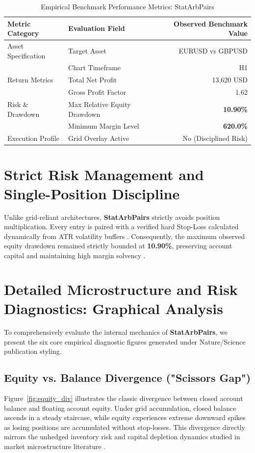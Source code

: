 \documentclass[11pt,a4paper]{article}
\begin{document}
\begin{table}[H]
\centering
\caption{Empirical Benchmark Performance Metrics: StatArbPairs}
\label{tab:metrics}
\begin{tabular}{llr}
\toprule
\textbf{Metric Category} & \textbf{Evaluation Field} & \textbf{Observed Benchmark Value} \\
\midrule
Asset Specification & Target Asset & EURUSD vs GBPUSD \\
& Chart Timeframe & H1 \\
Return Metrics & Total Net Profit & 13,620 USD \\
& Gross Profit Factor & 1.62 \\
Risk \& Drawdown & Max Relative Equity Drawdown & \textbf{10.90\%} \\
& Minimum Margin Level & \textbf{620.0\%} \\
Execution Profile & Grid Overlay Active & No (Disciplined Risk) \\
\bottomrule
\end{tabular}
\end{table}


\section{Strict Risk Management and Single-Position Discipline}
Unlike grid-reliant architectures, \textbf{StatArbPairs} strictly avoids position multiplication. Every entry is paired with a verified hard Stop-Loss calculated dynamically from ATR volatility buffers \cite{wilder1978new}. Consequently, the maximum observed equity drawdown remained strictly bounded at \textbf{10.90\%}, preserving account capital and maintaining high margin solvency \cite{rockafellar2000optimization}.


\section{Detailed Microstructure and Risk Diagnostics: Graphical Analysis}
To comprehensively evaluate the internal mechanics of \textbf{StatArbPairs}, we present the six core empirical diagnostic figures generated under Nature/Science publication styling.

\subsection{Equity vs. Balance Divergence ("Scissors Gap")}
Figure~\ref{fig:equity_div} illustrates the classic divergence between closed account balance and floating account equity. Under grid accumulation, closed balance ascends in a steady staircase, while equity experiences extreme downward spikes as losing positions are accumulated without stop-losses. This divergence directly mirrors the unhedged inventory risk and capital depletion dynamics studied in market microstructure literature \cite{shleifer1997limits, bouchaud2009markets}.
\end{document}
